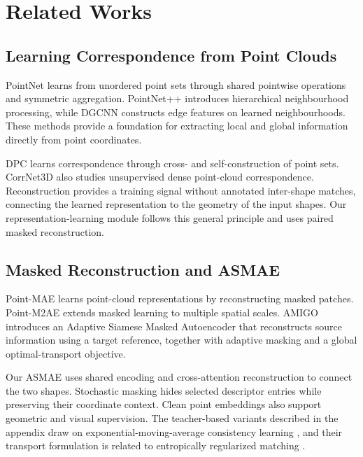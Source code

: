 \chapter{Related Works}
\label{Chapter2}

\section{Learning Correspondence from Point Clouds}
PointNet \citep{Qi_2017_CVPR} learns from unordered point sets through shared pointwise operations and symmetric aggregation. PointNet++ \citep{NIPS2017_d8bf84be} introduces hierarchical neighbourhood processing, while DGCNN \citep{wang2019dynamicgraphcnnlearning} constructs edge features on learned neighbourhoods. These methods provide a foundation for extracting local and global information directly from point coordinates.

DPC \citep{Lang_2021_DPC} learns correspondence through cross- and self-construction of point sets. CorrNet3D \citep{zeng2021corrnet3dunsupervisedendtoendlearning} also studies unsupervised dense point-cloud correspondence. Reconstruction provides a training signal without annotated inter-shape matches, connecting the learned representation to the geometry of the input shapes. Our representation-learning module follows this general principle and uses paired masked reconstruction.

\section{Masked Reconstruction and ASMAE}
Point-MAE \citep{Pang_2022} learns point-cloud representations by reconstructing masked patches. Point-M2AE \citep{Zhang_2022_ECCV} extends masked learning to multiple spatial scales. AMIGO \citep{article} introduces an Adaptive Siamese Masked Autoencoder that reconstructs source information using a target reference, together with adaptive masking and a global optimal-transport objective.

Our ASMAE uses shared encoding and cross-attention reconstruction to connect the two shapes. Stochastic masking hides selected descriptor entries while preserving their coordinate context. Clean point embeddings also support geometric and visual supervision. The teacher-based variants described in the appendix draw on exponential-moving-average consistency learning \citep{NIPS2017_68053af2}, and their transport formulation is related to entropically regularized matching \citep{Cuturi_2013}.

